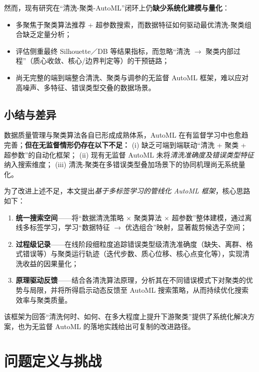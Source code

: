 \documentclass[10pt]{article} %
\numberwithin{equation}{section}
\begin{document}
\textcolor[rgb]{0.00,0.07,1.00}{然而，现有研究在“清洗-聚类-AutoML”闭环上仍\textbf{缺少系统化建模与量化}：
\begin{itemize}[nosep,leftmargin=*]
    \item 多聚焦于聚类算法推荐 + 超参数搜索，而数据特征如何驱动最优清洗-聚类组合缺乏定量分析；  
    \item 评估侧重最终 Silhouette／DB 等结果指标，而忽略“清洗 $\rightarrow$ 聚类内部过程”（质心收敛、核心/边界判定等）的干预链路；  
    \item 尚无完整的端到端整合清洗、聚类与调参的无监督 AutoML 框架，难以应对高噪声、多特征、错误类型交叠的数据场景。  
\end{itemize}}

\subsection{小结与差异}
\label{subsec:summary-related}

\textcolor[rgb]{0.00,0.07,1.00}{数据质量管理与聚类算法各自已形成成熟体系，AutoML 在有监督学习中也愈趋完善；\textbf{但在无监督情形仍存在以下不足：}
(i) 缺乏可端到端联动“清洗 + 聚类 + 超参数”的自动化框架；
(ii) 现有无监督 AutoML 未将\emph{清洗准确度及错误类型特征}纳入搜索维度；
(iii) 清洗-聚类在多错误类型叠加场景下的协同机理尚无系统量化。}

\medskip
\textcolor[rgb]{0.00,0.07,1.00}{
为了改进上述不足，本文提出\emph{基于多标签学习的管线化 AutoML 框架}，核心思路如下：  
\begin{enumerate}[nosep,leftmargin=*]
  \item \textbf{统一搜索空间}——将“数据清洗策略 $\times$ 聚类算法 $\times$ 超参数”整体建模，通过离线多标签学习，学习“数据特征 $\rightarrow$ 优选组合”映射，显著裁剪候选子空间；  
  \item \textbf{过程级记录}——在线阶段细粒度追踪错误类型级清洗准确度（缺失、离群、格式错误等）与聚类运行轨迹（迭代步数、质心位移、核心点变化等），实现清洗收益的因果量化；  
  \item \textbf{原理驱动反馈}——结合各清洗算法原理，分析其在不同错误模式下对聚类的优势与局限，并将所得启示动态反馈至 AutoML 搜索策略，从而持续优化搜索效率与聚类质量。  
\end{enumerate}
该框架为回答“清洗何时、如何、在多大程度上提升下游聚类”提供了系统化解决方案，也为无监督 AutoML 的落地实践给出可复制的改进路径。}

\section{问题定义与挑战}
\label{sec:problem-and-model}
\end{document}

